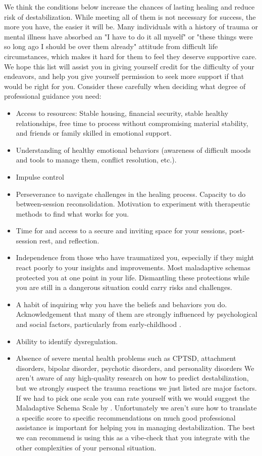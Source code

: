 \documentclass[12pt,letterpaper]{book}
\begin{document}
We think the conditions below increase the chances of lasting healing and reduce risk of destabilization. While meeting all of them is not necessary for success, the more you have, the easier it will be. Many individuals with a history of trauma or mental illness have absorbed an "I have to do it all myself" or "these things were so long ago I should be over them already" attitude from difficult life circumstances, which makes it hard for them to feel they deserve supportive care. We hope this list will assist you in giving yourself credit for the difficulty of your endeavors, and help you give yourself permission to seek more support if that would be right for you. Consider these carefully when deciding what degree of professional guidance you need:
\begin{itemize}
    \item Access to resources: Stable housing, financial security, stable healthy relationships, free time to process without compromising material stability, and friends or family skilled in emotional support.
    \item Understanding of healthy emotional behaviors (awareness of difficult moods and tools to manage them, conflict resolution, etc.).
    \item Impulse control
    \item Perseverance to navigate challenges in the healing process. Capacity to do between-session reconsolidation. Motivation to experiment with therapeutic methods to find what works for you.
    \item Time for and access to a secure and inviting space for your sessions, post-session rest, and reflection.
    \item Independence from those who have traumatized you, especially if they might react poorly to your insights and improvements. Most maladaptive schemas protected you at one point in your life. Dismantling these protections while you are still in a dangerous situation could carry risks and challenges.
    \item A habit of inquiring why you have the beliefs and behaviors you do. Acknowledgement that many of them are strongly influenced by psychological and social factors, particularly from early-childhood \cite{brownAttachmentDisturbances}.
    \item Ability to identify dysregulation.
    \item Absence of severe mental health problems such as CPTSD, attachment disorders, bipolar disorder, psychotic disorders, and personality disorders \label{assessDestabilizationRisk} We aren't aware of any high-quality research on how to predict destabilization, but we strongly suspect the trauma reactions we just listed are major factors. If we had to pick one scale you can rate yourself with we would suggest the Maladaptive Schema Scale by \textcite{maladaptiveSchemaScale}. Unfortunately we aren't sure how to translate a specific score to specific recommendations on much good professional assistance is important for helping you in managing destabilization. The best we can recommend is using this as a vibe-check that you integrate with the other complexities of your personal situation.
\end{itemize}
\end{document}
